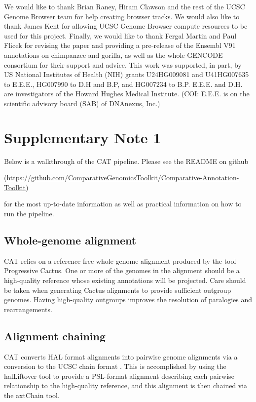 \documentclass[fleqn,10pt]{wlscirep}
\newcommand{\beginsupplement}{%
    \setcounter{table}{0}
    \renewcommand{\thetable}{S\arabic{table}}%
    \setcounter{figure}{0}
    \renewcommand{\thefigure}{S\arabic{figure}}%
   }
\begin{document}
We would like to thank Brian Raney, Hiram Clawson and the rest of the UCSC Genome Browser team for help creating browser tracks. We would also like to thank James Kent for allowing UCSC Genome Browser compute resources to be used for this project. Finally, we would like to thank Fergal Martin and Paul Flicek for revising the paper and providing a pre-release of the Ensembl V91 annotations on chimpanzee and gorilla, as well as the whole GENCODE consortium for their support and advice. This work was supported, in part, by US National Institutes of Health (NIH) grants U24HG009081 and U41HG007635 to E.E.E., HG007990 to D.H and B.P, and HG007234 to B.P. E.E.E. and D.H. are investigators of the Howard Hughes Medical Institute. (COI: E.E.E. is on the scientific advisory board (SAB) of DNAnexus, Inc.)



\clearpage
\beginsupplement

\section*{Supplementary Note 1}

Below is a walkthrough of the CAT pipeline. Please see the README on github 

(\url{https://github.com/ComparativeGenomicsToolkit/Comparative-Annotation-Toolkit}) 

for the most up-to-date information as well as practical information on how to run the pipeline. 

\subsection*{Whole-genome alignment}
	CAT relies on a reference-free whole-genome alignment produced by the tool Progressive Cactus. One or more of the genomes in the alignment should be a high-quality reference whose existing annotations will be projected. Care should be taken when generating Cactus alignments to provide sufficient outgroup genomes. Having high-quality outgroups improves the resolution of paralogies and rearrangements.

\subsection*{Alignment chaining}
	CAT converts HAL format alignments into pairwise genome alignments via a conversion to the UCSC chain format  \citep{kent2003evolution}. This is accomplished by using the halLiftover tool to provide a PSL-format alignment describing each pairwise relationship to the high-quality reference, and this alignment is then chained via the axtChain tool. 
  
\end{document}
